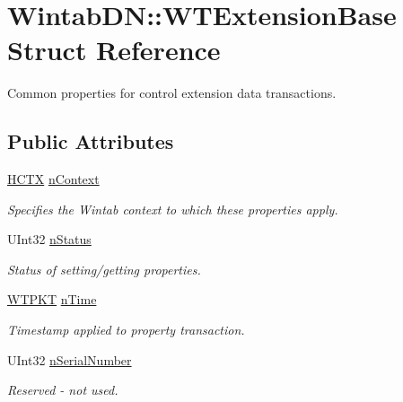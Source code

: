 \hypertarget{struct_wintab_d_n_1_1_w_t_extension_base}{
\section{WintabDN::WTExtensionBase Struct Reference}
\label{struct_wintab_d_n_1_1_w_t_extension_base}
}


Common properties for control extension data transactions.  


\subsection*{Public Attributes}
\begin{DoxyCompactItemize}
\item 
\hyperlink{class_wintab_d_n_1_1_h_c_t_x}{HCTX} \hyperlink{struct_wintab_d_n_1_1_w_t_extension_base_a6cb92705951cd2986eb41a839d6a4262}{nContext}
\begin{DoxyCompactList}\small\item\em Specifies the Wintab context to which these properties apply. \item\end{DoxyCompactList}\item 
UInt32 \hyperlink{struct_wintab_d_n_1_1_w_t_extension_base_aab3d8aef441f40cf947ee5dd34e9b15b}{nStatus}
\begin{DoxyCompactList}\small\item\em Status of setting/getting properties. \item\end{DoxyCompactList}\item 
\hyperlink{class_wintab_d_n_1_1_w_t_p_k_t}{WTPKT} \hyperlink{struct_wintab_d_n_1_1_w_t_extension_base_aff83fb6aa04f9b5938c0a76fe25ca653}{nTime}
\begin{DoxyCompactList}\small\item\em Timestamp applied to property transaction. \item\end{DoxyCompactList}\item 
UInt32 \hyperlink{struct_wintab_d_n_1_1_w_t_extension_base_acf18c03020a46eaec34c90454849b710}{nSerialNumber}
\begin{DoxyCompactList}\small\item\em Reserved -\/ not used. \item\end{DoxyCompactList}\end{DoxyCompactItemize}


